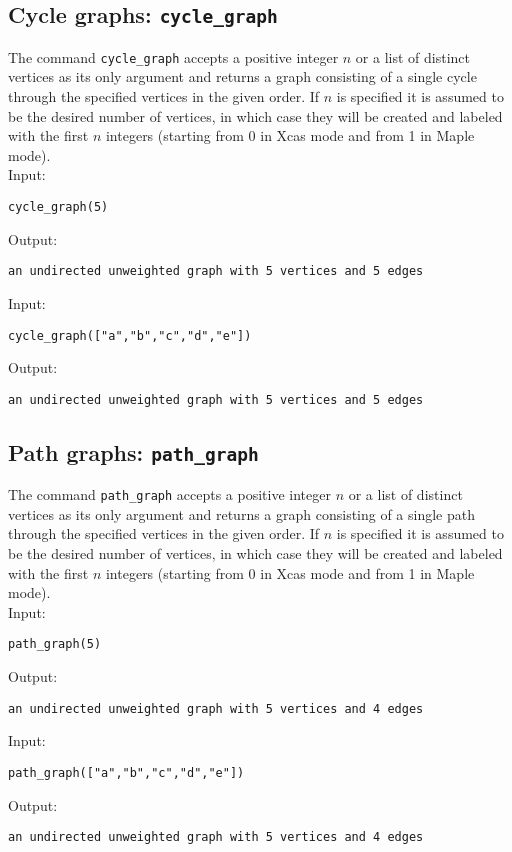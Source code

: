 \documentclass[a4paper,11pt]{article}
\begin{document}
\subsection{Cycle graphs: {\tt cycle\_graph}}

The command {\tt cycle\_graph} accepts a positive integer $ n $ or a list of distinct vertices as its only argument and returns a graph consisting of a single cycle through the specified vertices in the given order. If $ n $ is specified it is assumed to be the desired number of vertices, in which case they will be created and labeled with the first $ n $ integers (starting from 0 in Xcas mode and from 1 in Maple mode).\\
Input:
\begin{center}
  \tt cycle\_graph(5)
\end{center}
Output:
\begin{center}
  \tt an undirected unweighted graph with 5 vertices and 5 edges
\end{center}
Input:
\begin{center}
  \tt cycle\_graph(["a","b","c","d","e"])
\end{center}
Output:
\begin{center}
  \tt an undirected unweighted graph with 5 vertices and 5 edges
\end{center}

\subsection{Path graphs: {\tt path\_graph}}

The command {\tt path\_graph} accepts a positive integer $ n $ or a list of distinct vertices as its only argument and returns a graph consisting of a single path through the specified vertices in the given order. If $ n $ is specified it is assumed to be the desired number of vertices, in which case they will be created and labeled with the first $ n $ integers (starting from 0 in Xcas mode and from 1 in Maple mode).\\
Input:
\begin{center}
  \tt path\_graph(5)
\end{center}
Output:
\begin{center}
  \tt an undirected unweighted graph with 5 vertices and 4 edges
\end{center}
Input:
\begin{center}
  \tt path\_graph(["a","b","c","d","e"])
\end{center}
Output:
\begin{center}
  \tt an undirected unweighted graph with 5 vertices and 4 edges
\end{center}
\end{document}
